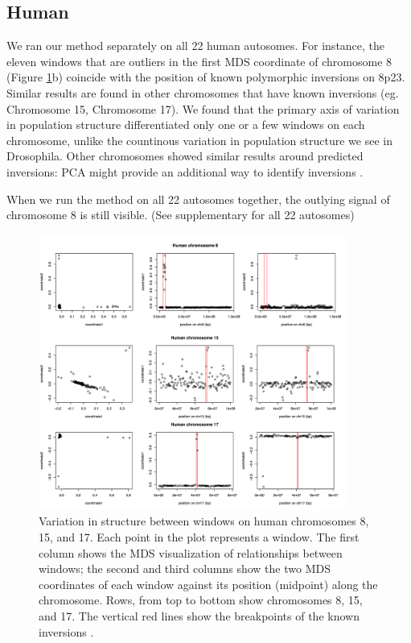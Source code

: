 \documentclass[11pt, oneside]{article}   	%
\begin{document}
\subsection{Human}
We ran our method separately on all 22 human autosomes. 
For instance, the eleven windows that are outliers in the first MDS coordinate of chromosome 8 (Figure \ref{fig:mds_human}b) coincide with the position of known polymorphic inversions on 8p23. 
Similar results are found in other chromosomes that have known inversions (eg. Chromosome 15, Chromosome 17).
We found that the primary axis of variation in population structure differentiated only one or a few windows on each chromosome, 
unlike the countinous variation in population structure we see in Drosophila.
Other chromosomes showed similar results around predicted inversions: PCA might provide an additional way to identify inversions \citep{ma2012investigation}.

When we run the method on all 22 autosomes together, the outlying signal of chromosome 8 is still visible. (See supplementary for all 22 autosomes)

\begin{figure}
    \begin{center}
       \includegraphics[width=0.9\textwidth]{Fig4_temp}
    \end{center}
    \caption{
         Variation in structure between windows on human chromosomes 8, 15, and 17. 
         Each point in the plot represents a window.
         The first column shows the MDS visualization of relationships between windows;
         the second and third columns show the two MDS coordinates of each window against its position (midpoint) along the chromosome. 
         Rows, from top to bottom show chromosomes 8, 15, and 17. 
         The vertical red lines show the breakpoints of the known inversions \citep{antonacci2009characterization}.
        \label{fig:mds_human}
    }
\end{figure}
\end{document}
